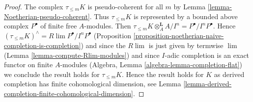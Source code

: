 \documentclass[10pt,a4paper]{amsart}
\theoremstyle{plain}
\theoremstyle{definition}
\theoremstyle{remark}
\numberwithin{equation}{subsection}
\def\lim{\mathop{\mathrm{lim}}\nolimits}
\begin{document}
\begin{proof}
The complex $\tau_{\leq m}K$ is pseudo-coherent for all $m$
by Lemma \ref{lemma-Noetherian-pseudo-coherent}.
Thus $\tau_{\leq m}K$ is represented by a bounded above complex
$P^\bullet$ of finite free $A$-modules. Then
$\tau_{\leq m}K \otimes_A^\mathbf{L} A/I^n = P^\bullet/I^nP^\bullet$.
Hence $(\tau_{\leq m}K)^\wedge = R\lim P^\bullet/I^nP^\bullet$
(Proposition \ref{proposition-noetherian-naive-completion-is-completion})
and since the $R\lim$ is just given by termwise $\lim$
(Lemma \ref{lemma-compute-Rlim-modules}) and since
$I$-adic completion is an exact functor on finite $A$-modules
(Algebra, Lemma \ref{algebra-lemma-completion-flat}) we conclude
the result holds for $\tau_{\leq m}K$. Hence the result holds for
$K$ as derived completion has finite cohomological dimension, see
Lemma \ref{lemma-derived-completion-finite-cohomological-dimension}.
\end{proof}
\end{document}
